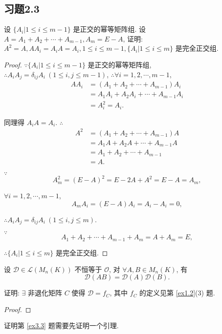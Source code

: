 \documentclass{ctexart}
\begin{document}
\subsection{习题2.3}
\begin{exercise}%
    设 $\{A_i|1\leq i\leq m-1\}$ 是正交的幂等矩阵组. 设 $A=A_1+A_2+\cdots+A_{m-1},A_m=E-A$, 证明: $A^2=A,AA_i=A_iA=A_i,1\leq i\leq m-1,\{A_i|1\leq i\leq m\}$ 是完全正交组.
\end{exercise}
\begin{proof}
    $\because\{A_i|1\leq i\leq m-1\}$ 是正交的幂等矩阵组, $\therefore A_iA_j=\delta_{ij}A_i\ (1\leq i,j\leq m-1)$, $\therefore\forall i=1,2,\cdots,m-1$,
    \begin{align*}
        AA_i & =(A_1+A_2+\cdots+A_{m-1})A_i \\
        & =A_1A_i+A_2A_i+\cdots+A_{m-1}A_i \\
        & =A_i^2=A_i.
    \end{align*}

    同理得 $A_iA=A_i$. $\therefore$
    \begin{align*}
        A^2 & =(A_1+A_2+\cdots+A_{m-1})A \\
        & =A_1A+A_2A+\cdots+A_{m-1}A \\
        & =A_1+A_2+\cdots+A_{m-1} \\
        & =A.
    \end{align*}

    $\because$
    \[A_m^2=(E-A)^2=E-2A+A^2=E-A=A_m,\]

    $\forall i=1,2,\cdots,m-1$,
    \[A_mA_i=(E-A)A_i=A_i-A_i=0,\]

    $\therefore A_iA_j=\delta_{ij}A_i\ (1\leq i,j\leq m)$.
    
    $\because$
    \[A_1+A_2+\cdots+A_{m-1}+A_m=A+A_m=E,\]

    $\therefore\{A_i|1\leq i\leq m\}$ 是完全正交组.
\end{proof}
\begin{exercise}%
    设 $\mathcal{D}\in\mathcal{L}(M_n(K))$ 不恒等于 $\mathcal{O}$, 对 $\forall A,B\in M_n(K)$, 有
    \[\mathcal{D}(AB)=\mathcal{D}(A)\mathcal{D}(B).\]

    证明: $\exists$ 非退化矩阵 $C$ 使得 $\mathcal{D}=f_C$, 其中 $f_C$ 的定义见第 \ref{ex1.2}(3) 题.
\end{exercise}
\begin{proof}
     
\end{proof}
证明第 \ref{ex3.3} 题需要先证明一个引理.
\end{document}
